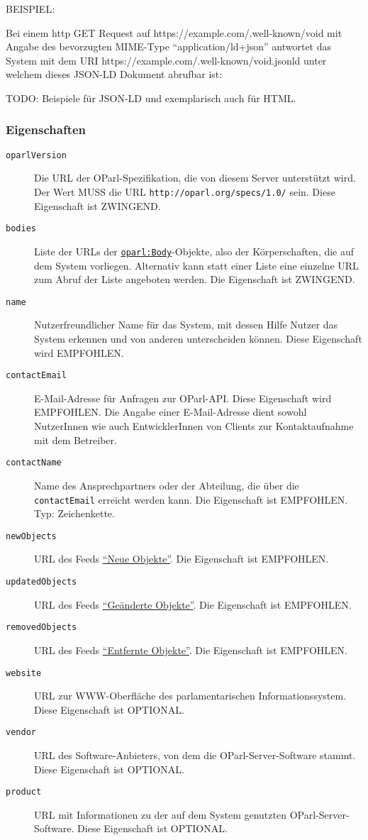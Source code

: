 \documentclass[,a4paper]{article}
\begin{document}
BEISPIEL:

Bei einem http GET Request auf https://example.com/.well-known/void mit
Angabe des bevorzugten MIME-Type ``application/ld+json'' antwortet das
System mit dem URI https://example.com/.well-known/void.jsonld unter
welchem dieses JSON-LD Dokument abrufbar ist:

TODO: Beispiele für JSON-LD und exemplarisch auch für HTML.

\subsubsection{Eigenschaften}\label{eigenschaften}

\begin{description}
\item[\texttt{oparlVersion}]
Die URL der OParl-Spezifikation, die von diesem Server unterstützt wird.
Der Wert MUSS die URL \texttt{http://oparl.org/specs/1.0/} sein. Diese
Eigenschaft ist ZWINGEND.
\item[\texttt{bodies}]
Liste der URLs der
\hyperref[oparlux5fbody]{\texttt{oparl:Body}}-Objekte, also der
Körperschaften, die auf dem System vorliegen. Alternativ kann statt
einer Liste eine einzelne URL zum Abruf der Liste angeboten werden. Die
Eigenschaft ist ZWINGEND.
\item[\texttt{name}]
Nutzerfreundlicher Name für das System, mit dessen Hilfe Nutzer das
System erkennen und von anderen unterscheiden können. Diese Eigenschaft
wird EMPFOHLEN.
\item[\texttt{contactEmail}]
E-Mail-Adresse für Anfragen zur OParl-API. Diese Eigenschaft wird
EMPFOHLEN. Die Angabe einer E-Mail-Adresse dient sowohl NutzerInnen wie
auch EntwicklerInnen von Clients zur Kontaktaufnahme mit dem Betreiber.
\item[\texttt{contactName}]
Name des Ansprechpartners oder der Abteilung, die über die
\texttt{contactEmail} erreicht werden kann. Die Eigenschaft ist
EMPFOHLEN. Typ: Zeichenkette.
\item[\texttt{newObjects}]
URL des Feeds \hyperref[feedux5fneueux5fobjekte]{``Neue Objekte''}. Die
Eigenschaft ist EMPFOHLEN.
\item[\texttt{updatedObjects}]
URL des Feeds \hyperref[feedux5fgeaenderteux5fobjekte]{``Geänderte
Objekte''}. Die Eigenschaft ist EMPFOHLEN.
\item[\texttt{removedObjects}]
URL des Feeds \hyperref[feedux5fentfernteux5fobjekte]{``Entfernte
Objekte''}. Die Eigenschaft ist EMPFOHLEN.
\item[\texttt{website}]
URL zur WWW-Oberfläche des parlamentarischen Informationssystem. Diese
Eigenschaft ist OPTIONAL.
\item[\texttt{vendor}]
URL des Software-Anbieters, von dem die OParl-Server-Software stammt.
Diese Eigenschaft ist OPTIONAL.
\item[\texttt{product}]
URL mit Informationen zu der auf dem System genutzten
OParl-Server-Software. Diese Eigenschaft ist OPTIONAL.
\end{description}
\end{document}
